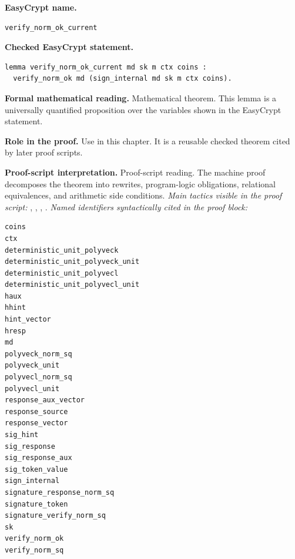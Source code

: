 \begin{formaltheorem}
\noindent\textbf{EasyCrypt name.}
\begin{lstlisting}[language=EasyCrypt,basicstyle=\ttfamily\scriptsize]
verify_norm_ok_current
\end{lstlisting}
\noindent\textbf{Checked EasyCrypt statement.}
\begin{lstlisting}[language=EasyCrypt,basicstyle=\ttfamily\scriptsize]
lemma verify_norm_ok_current md sk m ctx coins :
  verify_norm_ok md (sign_internal md sk m ctx coins).
\end{lstlisting}
\noindent\textbf{Formal mathematical reading.}
Mathematical theorem. This lemma is a universally quantified proposition over the variables shown in the EasyCrypt statement.

\noindent\textbf{Role in the proof.}
Use in this chapter. It is a reusable checked theorem cited by later proof scripts.

\noindent\textbf{Proof-script interpretation.}
Proof-script reading. The machine proof decomposes the theorem into rewrites, program-logic obligations, relational equivalences, and arithmetic side conditions.
\emph{Main tactics visible in the proof script:} , , , .
\emph{Named identifiers syntactically cited in the proof block:}
\begin{lstlisting}[language=EasyCrypt,basicstyle=\ttfamily\scriptsize]
coins
ctx
deterministic_unit_polyveck
deterministic_unit_polyveck_unit
deterministic_unit_polyvecl
deterministic_unit_polyvecl_unit
haux
hhint
hint_vector
hresp
md
polyveck_norm_sq
polyveck_unit
polyvecl_norm_sq
polyvecl_unit
response_aux_vector
response_source
response_vector
sig_hint
sig_response
sig_response_aux
sig_token_value
sign_internal
signature_response_norm_sq
signature_token
signature_verify_norm_sq
sk
verify_norm_ok
verify_norm_sq
\end{lstlisting}

\end{formaltheorem}

